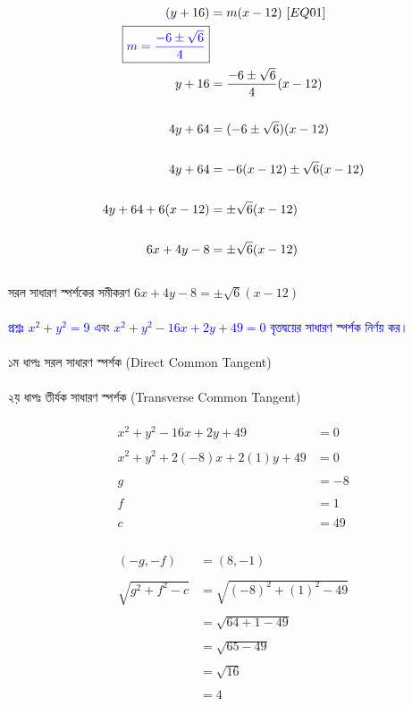 \documentclass{article}
\begin{document}
\\
\begin{align*}
	(y+16)&=m(x-12)\,\,[EQ01]\\
	\boxed{\textcolor{blue}{m=\frac{-6\pm\sqrt{6}}{4}}}&\\
	y+16&=\frac{-6\pm\sqrt{6}}{4}(x-12)\\
	\\
	4y+64&=(-6\pm\sqrt{6})(x-12)\\
	\\
	4y+64&=-6(x-12)\pm\sqrt{6}(x-12)\\
	\\
	4y+64+6(x-12)&=\pm\sqrt{6}(x-12)\\
	\\
	6x+4y-8&=\pm\sqrt{6}(x-12)\\
\end{align*}
\\
সরল সাধারণ স্পর্শকের সমীকরণ $6x+4y-8=\pm\sqrt{6}(x-12)$\\
\\
\textcolor{blue}{প্রশ্নঃ $x^2+y^2=9$ এবং  $x^2+y^2-16x+2y+49=0$ বৃত্তদ্বয়ের সাধারণ স্পর্শক নির্ণয় কর।}\\
\\ 
১ম ধাপঃ সরল সাধারণ স্পর্শক (Direct Common Tangent) \\
\\
২য় ধাপঃ তীর্যক সাধারণ স্পর্শক (Transverse Common Tangent) \\
\\ 
\begin{align*}
	x^2+y^2-16x+2y+49&=0\\
	\\
	x^2+y^2+2(-8)x+2(1)y+49&=0\\
	\\
	g&=-8\\
	\\
	f&=1\\
	\\
	c&=49\\
\end{align*}
\\
\begin{align*}
	(-g,-f)&=(8,-1)\\
	\\
	\sqrt{g^2+f^2-c}&=\sqrt{(-8)^2+(1)^2-49}\\
	\\
	&=\sqrt{64+1-49}\\
	\\
	&=\sqrt{65-49}\\
	\\
	&=\sqrt{16}\\
	\\
	&=4\\
\end{align*}
\end{document}
